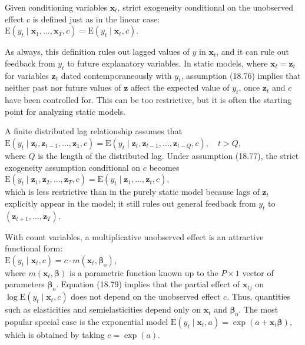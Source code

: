 \documentclass[10pt]{article}
\begin{document}
Given conditioning variables $\mathbf{x}_{t}$, strict exogeneity conditional on the unobserved effect $c$ is defined just as in the linear case:\\
$\mathrm{E}\left(y_{t} \mid \mathbf{x}_{1}, \ldots, \mathbf{x}_{T}, c\right)=\mathrm{E}\left(y_{t} \mid \mathbf{x}_{t}, c\right)$.

As always, this definition rules out lagged values of $y$ in $\mathbf{x}_{t}$, and it can rule out feedback from $y_{t}$ to future explanatory variables. In static models, where $\mathbf{x}_{t}=\mathbf{z}_{t}$ for variables $\mathbf{z}_{t}$ dated contemporaneously with $y_{t}$, assumption (18.76) implies that neither past nor future values of $\mathbf{z}$ affect the expected value of $y_{t}$, once $\mathbf{z}_{t}$ and $c$ have been controlled for. This can be too restrictive, but it is often the starting point for analyzing static models.

A finite distributed lag relationship assumes that\\
$\mathrm{E}\left(y_{t} \mid \mathbf{z}_{t}, \mathbf{z}_{t-1}, \ldots, \mathbf{z}_{1}, c\right)=\mathrm{E}\left(y_{t} \mid \mathbf{z}_{t}, \mathbf{z}_{t-1}, \ldots, \mathbf{z}_{t-Q}, c\right), \quad t>Q$,\\
where $Q$ is the length of the distributed lag. Under assumption (18.77), the strict exogeneity assumption conditional on $c$ becomes\\
$\mathrm{E}\left(y_{t} \mid \mathbf{z}_{1}, \mathbf{z}_{2}, \ldots, \mathbf{z}_{T}, c\right)=\mathrm{E}\left(y_{t} \mid \mathbf{z}_{1}, \ldots, \mathbf{z}_{t}, c\right)$,\\
which is less restrictive than in the purely static model because lags of $\mathbf{z}_{t}$ explicitly appear in the model; it still rules out general feedback from $y_{t}$ to $\left(\mathbf{z}_{t+1}, \ldots, \mathbf{z}_{T}\right)$.

With count variables, a multiplicative unobserved effect is an attractive functional form:\\
$\mathrm{E}\left(y_{t} \mid \mathbf{x}_{t}, c\right)=c \cdot m\left(\mathbf{x}_{t}, \boldsymbol{\beta}_{\mathrm{o}}\right)$,\\
where $m\left(\mathbf{x}_{t}, \boldsymbol{\beta}\right)$ is a parametric function known up to the $P \times 1$ vector of parameters $\boldsymbol{\beta}_{\mathrm{o}}$. Equation (18.79) implies that the partial effect of $\mathbf{x}_{t j}$ on $\log \mathrm{E}\left(y_{t} \mid \mathbf{x}_{t}, c\right)$ does not depend on the unobserved effect $c$. Thus, quantities such as elasticities and semielasticities depend only on $\mathbf{x}_{t}$ and $\boldsymbol{\beta}_{\mathrm{o}}$. The most popular special case is the exponential model $\mathrm{E}\left(y_{t} \mid \mathbf{x}_{t}, a\right)=\exp \left(a+\mathbf{x}_{t} \boldsymbol{\beta}\right)$, which is obtained by taking $c=\exp (a)$.
\end{document}

